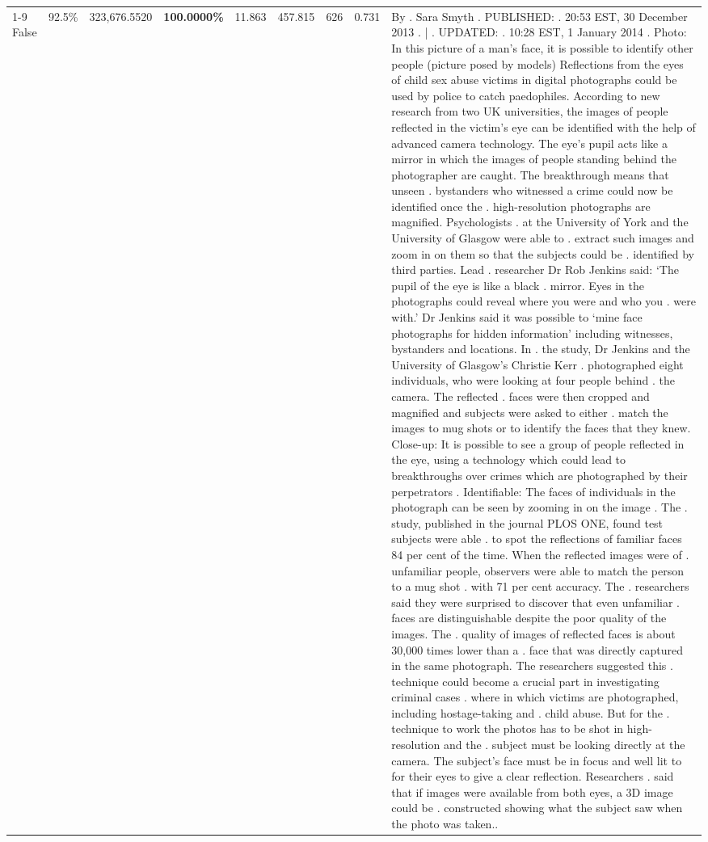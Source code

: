 \begin{table}[H]
\begin{tabular}{lllrlllll}
\cline{1-9}
False & 92.5\% & 323,676.5520 & \bfseries \color{red} 100.0000\% & 11.863 & 457.815 & 626 & 0.731 & By . Sara Smyth . PUBLISHED: . 20:53 EST, 30 December 2013 . | . UPDATED: . 10:28 EST, 1 January 2014 . Photo: In this picture of a man's face, it is possible to identify other people (picture posed by models) Reflections from the eyes of child sex abuse victims in digital photographs could be used by police to catch paedophiles. According to new research from two UK universities, the images of people reflected in the victim's eye can be identified with the help of advanced camera technology. The eye's pupil acts like a mirror in which the images of people standing behind the photographer are caught. The breakthrough means that unseen . bystanders who witnessed a crime could now be identified once the . high-resolution photographs are magnified. Psychologists . at the University of York and the University of Glasgow were able to . extract such images and zoom in on them so that the subjects could be . identified by third parties. Lead . researcher Dr Rob Jenkins said: ‘The pupil of the eye is like a black . mirror. Eyes in the photographs could reveal where you were and who you . were with.' Dr Jenkins said it was possible to ‘mine face photographs for hidden information' including witnesses, bystanders and locations. In . the study, Dr Jenkins and the University of Glasgow's Christie Kerr . photographed eight individuals, who were looking at four people behind . the camera. The reflected . faces were then cropped and magnified and subjects were asked to either . match the images to mug shots or to identify the faces that they knew. Close-up: It is possible to see a group of people reflected in the eye, using a technology which could lead to breakthroughs over crimes which are photographed by their perpetrators . Identifiable: The faces of individuals in the photograph can be seen by zooming in on the image . The . study, published in the journal PLOS ONE, found test subjects were able . to spot the reflections of familiar faces 84 per cent of the time. When the reflected images were of . unfamiliar people, observers were able to match the person to a mug shot . with 71 per cent accuracy. The . researchers said they were surprised to discover that even unfamiliar . faces are distinguishable despite the poor quality of the images. The . quality of images of reflected faces is about 30,000 times lower than a . face that was directly captured in the same photograph. The researchers suggested this . technique could become a crucial part in investigating criminal cases . where in which victims are photographed, including hostage-taking and . child abuse. But for the . technique to work the photos has to be shot in high-resolution and the . subject must be looking directly at the camera. The subject's face must be in focus and well lit to for their eyes to give a clear reflection. Researchers . said that if images were available from both eyes, a 3D image could be . constructed showing what the subject saw when the photo was taken.. \\

\end{tabular}
\end{table}
